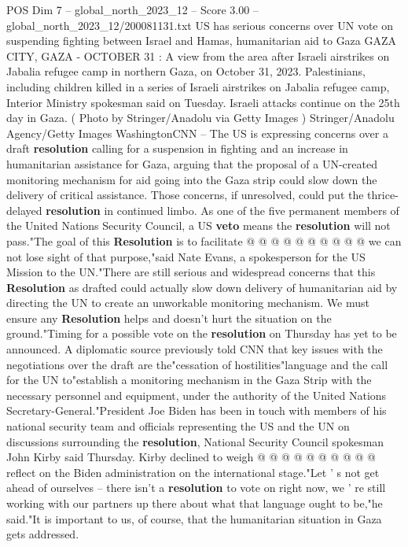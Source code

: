 \begin{textsample}{POS Dim 7 – global\_north\_2023\_12 – Score 3.00 – global\_north\_2023\_12/200081131.txt}  \label{ex:f7_pos_301}
US has serious concerns over UN vote on suspending fighting between Israel and Hamas, humanitarian aid to Gaza GAZA CITY, GAZA - OCTOBER 31 : A view from the area after Israeli airstrikes on Jabalia refugee camp in northern Gaza, on October 31, 2023.
Palestinians, including children killed in a series of Israeli airstrikes on Jabalia refugee camp, Interior Ministry spokesman said on Tuesday.
Israeli attacks continue on the 25th day in Gaza. ( Photo by Stringer/Anadolu via Getty Images ) Stringer/Anadolu Agency/Getty Images WashingtonCNN -- The US is expressing concerns over a draft \textbf{resolution} calling for a suspension in fighting and an increase in humanitarian assistance for Gaza, arguing that the proposal of a UN-created monitoring mechanism for aid going into the Gaza strip could slow down the delivery of critical assistance.
Those concerns, if unresolved, could put the thrice-delayed \textbf{resolution} in continued limbo.
As one of the five permanent members of the United Nations Security Council, a US \textbf{veto} means the \textbf{resolution} will not pass."The goal of this \textbf{Resolution} is to facilitate @ @ @ @ @ @ @ @ @ @ we can not lose sight of that purpose,"said Nate Evans, a spokesperson for the US Mission to the UN."There are still serious and widespread concerns that this \textbf{Resolution} as drafted could actually slow down delivery of humanitarian aid by directing the UN to create an unworkable monitoring mechanism.
We must ensure any \textbf{Resolution} helps and doesn't hurt the situation on the ground."Timing for a possible vote on the \textbf{resolution} on Thursday has yet to be announced.
A diplomatic source previously told CNN that key issues with the negotiations over the draft are the"cessation of hostilities"language and the call for the UN to"establish a monitoring mechanism in the Gaza Strip with the necessary personnel and equipment, under the authority of the United Nations Secretary-General."President Joe Biden has been in touch with members of his national security team and officials representing the US and the UN on discussions surrounding the \textbf{resolution}, National Security Council spokesman John Kirby said Thursday.
Kirby declined to weigh @ @ @ @ @ @ @ @ @ @ reflect on the Biden administration on the international stage."Let ' s not get ahead of ourselves -- there isn't a \textbf{resolution} to vote on right now, we ' re still working with our partners up there about what that language ought to be,"he said."It is important to us, of course, that the humanitarian situation in Gaza gets addressed.

\end{textsample}

